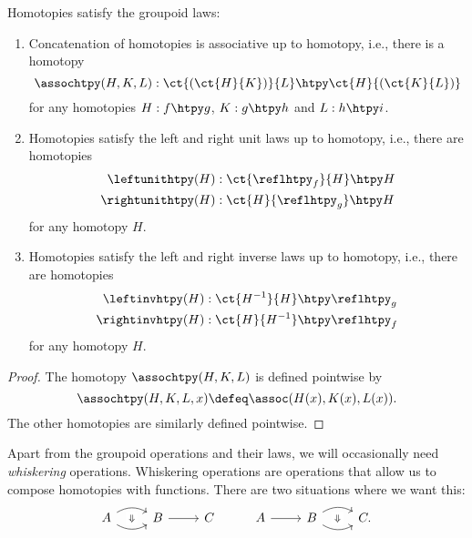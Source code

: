 \begin{prp}
  Homotopies satisfy the groupoid laws:
  \begin{enumerate}
  \item Concatenation of homotopies is associative up to homotopy, i.e., there is a homotopy
    \begin{equation*}
      \assochtpy(H,K,L) : \ct{(\ct{H}{K})}{L}\htpy\ct{H}{(\ct{K}{L})}
    \end{equation*}
    for any homotopies $H:f\htpy g$, $K:g\htpy h$ and $L:h\htpy i$.
  \item Homotopies satisfy the left and right unit laws up to homotopy, i.e., there are homotopies
    \begin{align*}
    \leftunithtpy(H) & : \ct{\reflhtpy_f}{H}\htpy H \\
    \rightunithtpy(H) & : \ct{H}{\reflhtpy_g}\htpy H 
    \end{align*}
    for any homotopy $H$.
  \item Homotopies satisfy the left and right inverse laws up to homotopy, i.e., there are homotopies
    \begin{align*}
      \leftinvhtpy(H) & : \ct{H^{-1}}{H} \htpy \reflhtpy_g \\
      \rightinvhtpy(H) & : \ct{H}{H^{-1}} \htpy \reflhtpy_f
    \end{align*}
    for any homotopy $H$.
  \end{enumerate}
\end{prp}

\begin{proof}
  The homotopy $\assochtpy(H,K,L)$ is defined pointwise by
  \begin{equation*}
    \assochtpy(H,K,L,x) \defeq \assoc(H(x),K(x),L(x)).
  \end{equation*}
  The other homotopies are similarly defined pointwise.
\end{proof}

Apart from the groupoid operations and their laws, we will occasionally need \emph{whiskering} operations. Whiskering operations are operations that allow us to compose homotopies with functions. There are two situations where we want this:
\begin{equation*}
  \begin{tikzcd}
    A \arrow[r,bend left,""{name=A,below}] \arrow[r,bend right,""{name=B,above}] \arrow[from=A,to=B,draw=none,"\Downarrow" description] & B \arrow[r] & C & A \arrow[r] & B \arrow[r,bend left,""{name=C,below}] \arrow[r,bend right,""{name=D,above}] \arrow[from=C,to=D,draw=none,"\Downarrow" description] & C.
  \end{tikzcd}
\end{equation*}

